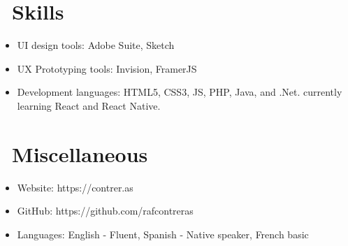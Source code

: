 \documentclass{resume}
\begin{document}
\section{\faCogs\ Skills}
\begin{itemize}[parsep=0.5ex]
  \item UI design tools: Adobe Suite, Sketch
  \item UX Prototyping tools: Invision, FramerJS
  \item Development languages: HTML5, CSS3, JS, PHP, Java, and .Net. currently learning React and React Native.
\end{itemize}

\section{\faInfo\ Miscellaneous}
\begin{itemize}[parsep=0.5ex]
  \item Website: https://contrer.as
  \item GitHub: https://github.com/rafcontreras
  \item Languages: English - Fluent, Spanish - Native speaker, French basic
\end{itemize}

%
%
\end{document}
